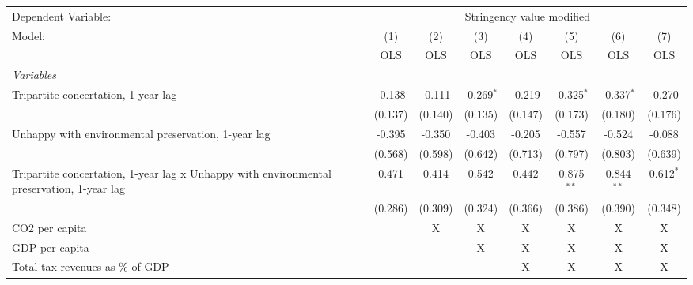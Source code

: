 
\begingroup
\centering
\begin{tabular}{lccccccc}
   \toprule
   Dependent Variable: & \multicolumn{7}{c}{Stringency value modified}\\
   Model:                                                                                    & (1)     & (2)     & (3)          & (4)     & (5)          & (6)          & (7)\\  
                                                                                             &  OLS    & OLS     & OLS          & OLS     & OLS          & OLS          & OLS\\  
   \midrule
   \emph{Variables}\\
   Tripartite concertation, 1-year lag                                                       & -0.138  & -0.111  & -0.269$^{*}$ & -0.219  & -0.325$^{*}$ & -0.337$^{*}$ & -0.270\\   
                                                                                             & (0.137) & (0.140) & (0.135)      & (0.147) & (0.173)      & (0.180)      & (0.176)\\   
   Unhappy with environmental preservation, 1-year lag                                       & -0.395  & -0.350  & -0.403       & -0.205  & -0.557       & -0.524       & -0.088\\   
                                                                                             & (0.568) & (0.598) & (0.642)      & (0.713) & (0.797)      & (0.803)      & (0.639)\\   
   Tripartite concertation, 1-year lag x Unhappy with environmental preservation, 1-year lag & 0.471   & 0.414   & 0.542        & 0.442   & 0.875$^{**}$ & 0.844$^{**}$ & 0.612$^{*}$\\   
                                                                                             & (0.286) & (0.309) & (0.324)      & (0.366) & (0.386)      & (0.390)      & (0.348)\\   
   CO2 per capita                                                                            &         & X       & X            & X       & X            & X            & X\\  
   GDP per capita                                                                            &         &         & X            & X       & X            & X            & X\\  
   Total tax revenues as \% of GDP                                                           &         &         &              & X       & X            & X            & X\\  

\end{tabular}
